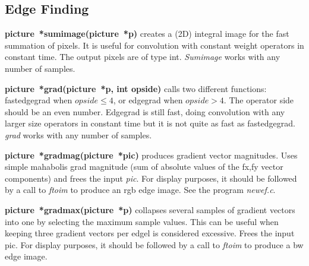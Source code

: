 \documentclass[11pt,twoside,english,a4paper]{article}
\begin{document}

\subsection{Edge Finding}
\textbf{picture~{*}sumimage(picture~{*p})} creates a (2D) integral image for the fast 
summation of pixels. It is useful for convolution with constant weight operators in constant time.
The output pixels are of type int. \emph{Sumimage} works with any number of samples.

\textbf{picture~{*}grad(picture~{*p}, int opside)} calls two different functions: fastedgegrad
when $opside \leq 4$, or edgegrad when $opside > 4$. 
The operator side should be an even number. Edgegrad is still fast, doing convolution
with any larger size operators in constant time but it is not quite as fast as fastedgegrad.
\emph{grad} works with any number of samples.

\textbf{picture~{*}gradmag(picture~{*pic})} produces gradient vector 
magnitudes. Uses simple mahabolis grad magnitude 
(sum of absolute values of the fx,fy vector components) and frees the input \emph{pic}.
For display purposes, it should be followed by a call to \emph{ftoim} to produce
an rgb edge image. See the program \emph{newef.c}.

\textbf{picture~{*}gradmax(picture~{*p})} collapses several samples of gradient 
vectors into one by selecting the maximum sample values.
This can be useful when keeping three gradient vectors per edgel is considered excessive.
Frees the input pic. For display purposes, it should be followed by a call to 
\emph{ftoim} to produce a bw edge image.
\end{document}
